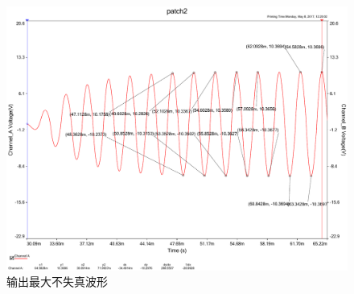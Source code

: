 \documentclass[UTF8,a4paper]{paper}
\begin{document}
\begin{figure}[H]
\centering
\includegraphics[width=\textwidth]{maxac.pdf}
\caption{输出最大不失真波形}
\label{ACmax}
\end{figure}
\end{document}

